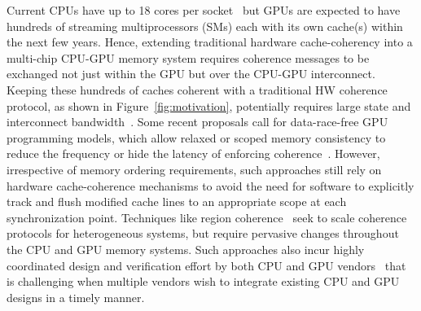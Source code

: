 
Current CPUs have up to 18 cores per socket~\cite{INTELXEONE5V3} but GPUs are
expected to have hundreds of streaming multiprocessors (SMs) each with its own
cache(s) within the next few years. Hence, extending traditional hardware
cache-coherency into a multi-chip CPU-GPU memory system requires coherence
messages to be exchanged not just within the GPU but over the CPU-GPU
interconnect. Keeping these hundreds of caches coherent with a traditional HW
coherence protocol, as shown in Figure~\ref{fig:motivation}, potentially
requires large state and interconnect bandwidth~\cite{Kelm2010,johnson2011}.
Some recent proposals call for data-race-free GPU programming models, which
allow relaxed or scoped memory consistency to reduce the frequency or hide the
latency of enforcing coherence~\cite{Hechtman2014}.  However, irrespective of
memory ordering requirements, such approaches still rely on hardware
cache-coherence mechanisms to  avoid the need for software to explicitly track
and flush modified cache lines to an appropriate scope at each synchronization
point. Techniques like region coherence~\cite{Power2013} seek to scale coherence
protocols for heterogeneous systems, but require pervasive changes throughout
the CPU and GPU memory systems. Such approaches also incur highly coordinated
design and verification effort by both CPU and GPU vendors~\cite{Hong2012} that
is challenging when multiple vendors wish to integrate existing CPU and GPU
designs in a timely manner.

